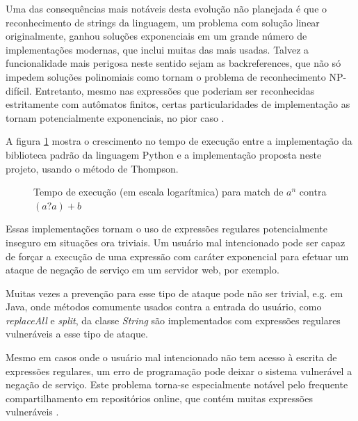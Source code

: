 \documentclass[a4paper,12pt,oneside,onecolumn]{uerj}
\begin{document}
Uma das consequências mais notáveis desta evolução não planejada é que o reconhecimento de strings da linguagem, um problema com solução linear originalmente, ganhou soluções exponenciais em um grande número de implementações modernas, que inclui muitas das mais usadas. Talvez a funcionalidade mais perigosa neste sentido sejam as backreferences, que não só impedem soluções polinomiais como tornam o problema de reconhecimento NP-difícil. Entretanto, mesmo nas expressões que poderiam ser reconhecidas estritamente com autômatos finitos, certas particularidades de implementação as tornam potencialmente exponenciais, no pior caso \cite{bib:Cox07}.

A figura \ref{fig:benchmark1} mostra o crescimento no tempo de execução entre a implementação da biblioteca padrão da linguagem Python e a implementação proposta neste projeto, usando o método de Thompson. 

\begin{figure}[ht]
\centering
{}
\caption{Tempo de execução (em escala logarítmica) para match de $a^n$ contra $(a?a)+b$}
\label{fig:benchmark1}
\end{figure}

Essas implementações tornam o uso de expressões regulares potencialmente inseguro em situações ora triviais. Um usuário mal intencionado pode ser capaz de forçar a execução de uma expressão com caráter exponencial para efetuar um ataque de negação de serviço em um servidor web, por exemplo. 

Muitas vezes a prevenção para esse tipo de ataque pode não ser trivial, e.g. em Java, onde métodos comumente usados contra a entrada do usuário, como \emph{replaceAll} e \emph{split}, da classe \emph{String} são implementados com expressões regulares vulneráveis a esse tipo de ataque.

Mesmo em casos onde o usuário mal intencionado não tem acesso à escrita de expressões regulares, um erro de programação pode deixar o sistema vulnerável a negação de serviço. Este problema torna-se especialmente notável pelo frequente compartilhamento em repositórios online, que contém muitas expressões vulneráveis \cite{bib:Kirrage13,bib:Weidman10}. 
\end{document}
